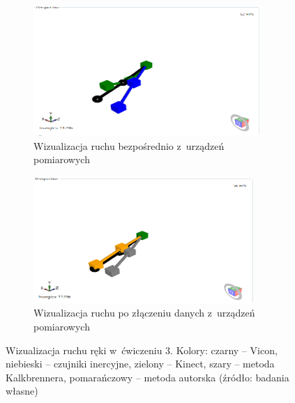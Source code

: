 \begin{savenotes}
	\begin{figure}[!htb]
		\captionsetup{singlelinecheck=off}
		\centering
		\begin{subfigure}[b]{\textwidth}
			\centering
			\includegraphics[width=\textwidth]{images/300/raw.png}	
			\caption{Wizualizacja ruchu bezpośrednio z~urządzeń pomiarowych}
			\label{fig:experiments:th:raw}
		\end{subfigure}
																																											
		\begin{subfigure}[b]{\textwidth}
			\centering
			\includegraphics[width=\textwidth]{images/300/Fused.png}		
			\caption{Wizualizacja ruchu po złączeniu danych z~urządzeń pomiarowych}
			\label{fig:experiments:th:fused}	
		\end{subfigure}
																																										
		\caption[Wizualizacja ruchu ręki w~ćwiczeniu 3]{Wizualizacja ruchu ręki w~ćwiczeniu 3.  Kolory: czarny -- Vicon, niebieski -- czujniki inercyjne, zielony -- Kinect, szary -- metoda Kalkbrennera, pomarańczowy -- metoda autorska (źródło: badania własne)}	
		\label{fig:experiments:th}
	\end{figure}
\end{savenotes}
																				
